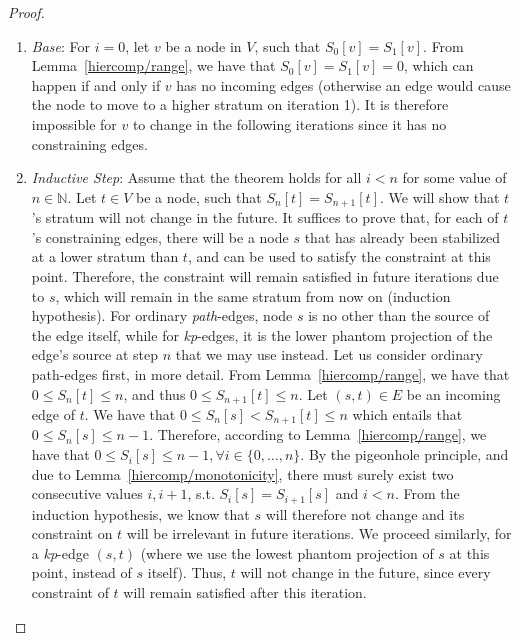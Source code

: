 \begin{proof}
  \begin{enumerate}
  \item \emph{Base}: For $i = 0$, let $v$ be a node in $V$, such that
    $S_0[v] = S_{1}[v]$. From Lemma~\ref{hiercomp/range}, we have that
    $S_0[v] = S_{1}[v] = 0$, which can happen if and only if $v$ has
    no incoming edges (otherwise an edge would cause the node to move
    to a higher stratum on iteration 1). It is therefore impossible
    for $v$ to change in the following iterations since it has no
    constraining edges.
  \item \emph{Inductive Step}: Assume that the theorem holds for all $i
    < n$ for some value of $n \in \mathbb{N}$. Let $t \in V$ be a
    node, such that $S_n[t] = S_{n+1}[t]$.  We will show that $t$'s stratum will
    not change in the future. It suffices to prove that, for each of
    $t$'s constraining edges, there will be a node $s$ that has
    already been stabilized at a lower stratum than $t$, and can be
    used to satisfy the constraint at this point. Therefore, the
    constraint will remain satisfied in future iterations due to $s$,
    which will remain in the same stratum from now on (induction
    hypothesis). For ordinary \emph{path}-edges, node $s$ is no other
    than the source of the edge itself, while for \emph{kp}-edges,
    it is the lower phantom projection of the edge's source at step
    $n$ that we may use instead. Let us consider ordinary path-edges
    first, in more detail. From Lemma~\ref{hiercomp/range}, we have that $0
    \leq S_n[t] \leq n$, and thus $0 \leq S_{n+1}[t] \leq n$.  Let
    $(s,t) \in E$ be an incoming edge of $t$. We have that $0\leq
    S_{n}[s] < S_{n+1}[t] \leq n$ which entails that $0 \leq S_{n}[s]
    \leq n - 1$.  Therefore, according to Lemma~\ref{hiercomp/range}, we have
    that $0 \leq S_{i}[s] \leq n - 1, \forall i \in \{0,\ldots{},n\}$.
    By the pigeonhole principle, and due to Lemma~\ref{hiercomp/monotonicity},
    there must surely exist two consecutive values $i,i+1$,
    s.t. $S_i[s] = S_{i+1}[s]$ and $i < n$. From the induction
    hypothesis, we know that $s$ will therefore not change and its
    constraint on $t$ will be irrelevant in future iterations. We
    proceed similarly, for a \emph{kp}-edge $(s,t)$ (where we use
    the lowest phantom projection of $s$ at this point, instead of $s$
    itself). Thus, $t$ will not change in the future, since every
    constraint of $t$ will remain satisfied after this iteration.
  \end{enumerate}
\end{proof}

